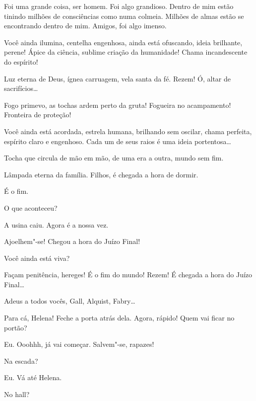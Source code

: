  Foi uma grande coisa, ser homem. Foi algo grandioso. Dentro de mim
estão tinindo milhões de consciências como numa colmeia. Milhões de almas estão
se encontrando dentro de mim. Amigos, foi algo imenso.

 Você ainda ilumina, centelha engenhosa, ainda está ofuscando,
ideia brilhante, perene! Ápice da ciência, sublime criação da humanidade! Chama incandescente
do espírito!

 Luz eterna de Deus, ígnea carruagem, vela santa da fé. Rezem! Ó,
altar de sacrifícios\ldots{}

 Fogo primevo, as tochas ardem perto da gruta! Fogueira no
acampamento! Fronteira de proteção!

 Você ainda está acordada, estrela humana, brilhando sem oscilar, chama
perfeita, espírito claro e engenhoso. Cada um de seus raios é uma ideia portentosa\ldots{}

 Tocha que circula de mão em mão, de uma era a outra, mundo sem fim.

 Lâmpada eterna da família. Filhos, é chegada a hora de dormir.

 É o fim.

 O que aconteceu?

 A usina caiu. Agora é a nossa vez.

 Ajoelhem"-se! Chegou a hora do Juízo Final!

 Você ainda está viva?

 Façam penitência, hereges! É o fim do mundo! Rezem!  É chegada a hora do Juízo Final\ldots{}

 Adeus a todos vocês, Gall, Alquist, Fabry\ldots{}

  Para cá, Helena! Feche a porta atrás
dela. Agora, rápido! Quem vai ficar no portão?

 Eu.  Ooohhh, já vai começar.
Salvem"-se, rapazes! 

 Na escada?

 Eu. Vá até Helena. 

 No hall?

